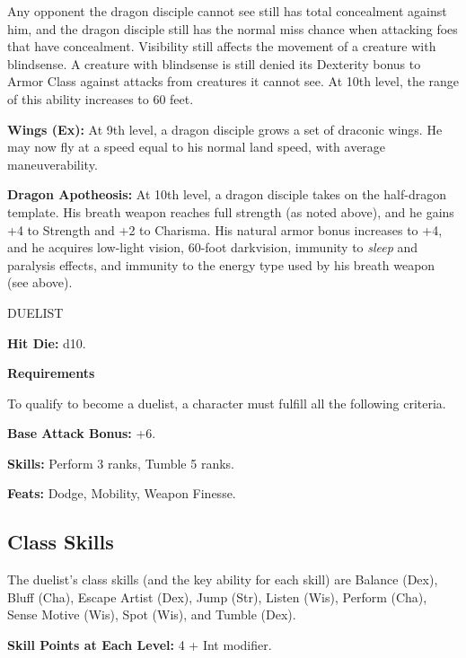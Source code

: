 \documentclass{article}
\begin{document}
Any opponent the dragon disciple cannot see still has total concealment against 
him, and the dragon disciple still has the normal miss chance when attacking foes 
that have concealment. Visibility still affects the movement of a creature with 
blindsense. A creature with blindsense is still denied its Dexterity bonus to Armor 
Class against attacks from creatures it cannot see. At 10th level, the range of 
this ability increases to 60 feet.

\textbf{Wings (Ex):} At 9th level, a dragon disciple grows a set of draconic wings. 
He may now fly at a speed equal to his normal land speed, with average maneuverability.

\textbf{Dragon Apotheosis:} At 10th level, a dragon disciple takes on the half-dragon 
template. His breath weapon reaches full strength (as noted above), and he gains 
+4 to Strength and +2 to Charisma. His natural armor bonus increases to +4, and 
he acquires low-light vision, 60-foot darkvision, immunity to \textit{sleep }and 
paralysis effects, and immunity to the energy type used by his breath weapon (see 
above).

\vspace{12pt}
DUELIST

\textbf{Hit Die:} d10.

\textbf{Requirements}

To qualify to become a duelist, a character must fulfill all the following criteria.

\textbf{Base Attack Bonus:} +6. 

\parindent=3pt
\textbf{Skills:} Perform 3 ranks, Tumble 5 ranks.

\parindent=0pt
\textbf{Feats:} Dodge, Mobility, Weapon Finesse.

\subsection*{\textbf{Class Skills}}

The duelist's class skills (and the key ability for each skill) are Balance (Dex), 
Bluff (Cha), Escape Artist (Dex), Jump (Str), Listen (Wis), Perform (Cha), Sense 
Motive (Wis), Spot (Wis), and Tumble (Dex). 

\parindent=3pt
\textbf{Skill Points at Each Level:} 4 + Int modifier.
\end{document}
